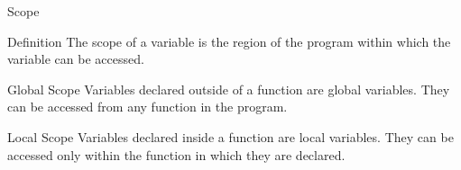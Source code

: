 \begin{frame}{Scope}
    \begin{block}{Definition}
        The scope of a variable is the region of the program within which the variable can be accessed.
    \end{block}
    \begin{block}{Global Scope}
        Variables declared outside of a function are global variables. They can be accessed from any function in the program.
    \end{block}
    \begin{block}{Local Scope}
        Variables declared inside a function are local variables. They can be accessed only within the function in which they are declared.
    \end{block}
\end{frame}